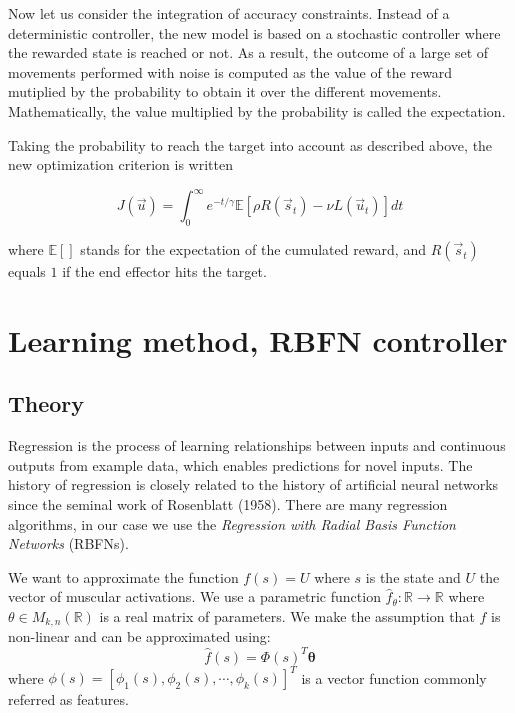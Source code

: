 \documentclass[pdftex,a4paper,12pt]{report}
\begin{document}
Now let us consider the integration of accuracy constraints. Instead of a deterministic controller, the new model is based on a stochastic controller where the rewarded state is reached or not. As a result, the outcome of a large set of movements performed with noise is computed as the value of the reward mutiplied by the probability to obtain it over the different movements. 
Mathematically, the value multiplied by the probability is called the expectation.

Taking the probability to reach the target into account as described above, the new optimization criterion is written

\begin{equation}
\label{eq:expectation}
 J(\vec{u}) = \int_0^{\infty} e^{-t/\gamma} \mathbb{E}[ \rho R(\vec{s}_t) - \nu L(\vec{u}_t) ] dt
\end{equation}

where $\mathbb{E}[]$ stands for the expectation of the cumulated reward, and $R(\vec{s}_t)$  equals $1$ if the end effector hits the target.

\section{Learning method, RBFN controller}
\label{sec_rbfn}

\subsection{Theory}

Regression is the process of learning relationships between inputs and continuous outputs from example data, which enables predictions for novel inputs.
The history of regression is closely related to the history of artificial neural networks since the seminal work of Rosenblatt (1958).
There are many regression algorithms, in our case we use the \textit{Regression with Radial Basis Function Networks} (RBFNs).

We want to approximate the function $f(s) = U$ where $s$ is the state and $U$ the vector of muscular activations.
We use a parametric function $\hat{f}_\theta: \mathbb{R} \rightarrow \mathbb{R}$ where $\theta \in M_{k,n}(\mathbb{R})$ is a real matrix of parameters. We make the assumption that $f$ is non-linear and can be approximated using:
\begin{equation}
	\hat{f}(s) = \Phi(s)^T\boldsymbol{\theta}
\end{equation}
where  
$\phi(s) = [\phi_1(s), \phi_2(s), \cdots, \phi_k(s)]^T$
is a vector function commonly referred as features.
\end{document}
